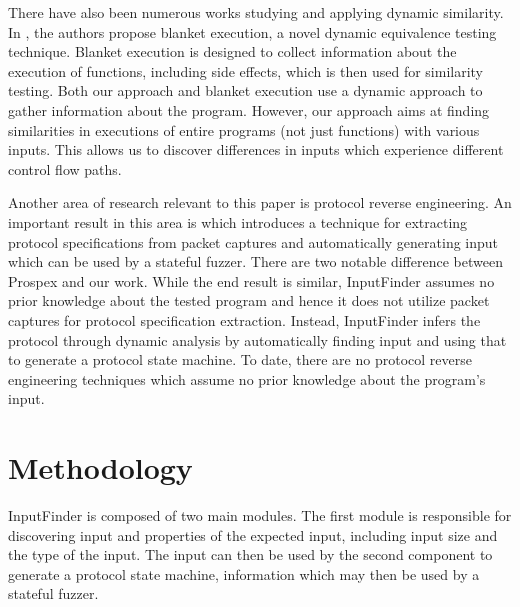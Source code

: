 \documentclass{acm_proc_article-sp}
\def \tool {InputFinder}
\begin{document}
There have also been numerous works studying and applying dynamic similarity.
In \cite{blanketexec}, the authors propose blanket execution, a novel dynamic equivalence testing technique.
Blanket execution is designed to collect information about the execution of functions, including side effects, which is then used for similarity testing.
Both our approach and blanket execution use a dynamic approach to gather information about the program.
However, our approach aims at finding similarities in executions of entire programs (not just functions) with various inputs.
This allows us to discover differences in inputs which experience different control flow paths.

Another area of research relevant to this paper is protocol reverse engineering.
An important result in this area is \cite{prospex} which introduces a technique for extracting protocol specifications from packet captures and automatically generating input which can be used by a stateful fuzzer.
There are two notable difference between Prospex and our work.
While the end result is similar, \tool{} assumes no prior knowledge about the tested program and hence it does not utilize packet captures for protocol specification extraction.
Instead, \tool{} infers the protocol through dynamic analysis by automatically finding input and using that to generate a protocol state machine.
To date, there are no protocol reverse engineering techniques which assume no prior knowledge about the program's input.

\section{Methodology} \label{methodology}
\tool{} is composed of two main modules.
The first module is responsible for discovering input and properties of the expected input, including input size and the type of the input.
The input can then be used by the second component to generate a protocol state machine, information which may then be used by a stateful fuzzer.
\end{document}
